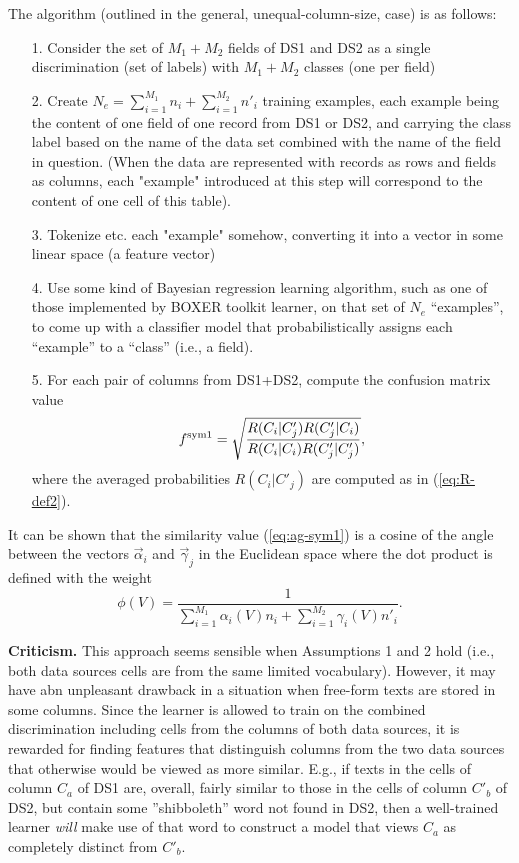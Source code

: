 \documentclass[12pt]{article}
\begin{document}
The algorithm (outlined in the general, unequal-column-size, case) is
as follows:

\begin{enumerate}
\item[1.] Consider the set of $M_1+M_2$ fields of DS1 and DS2 as a single
  discrimination (set of labels) with $M_1+M_2$ classes (one per field)

\item[2.] Create $N_e = \sum_{i=1}^{M_1} n_i + \sum_{i=1}^{M_2} n'_i$
  training examples, each example being the content of one field of
  one record from DS1 or DS2, and carrying the class label based on
  the name of the data set combined with the name of the field in
  question. (When the data are represented with records as rows and
  fields as columns, each "example" introduced at this step will
  correspond to the content of one cell of this table).

\item[3.] Tokenize etc. each "example" somehow, converting it into a
  vector in some linear space (a feature vector)

\item[4.] Use some kind of Bayesian regression learning algorithm, such
  as one of those implemented by BOXER toolkit learner, on that set of $N_e$
  ``examples'', to come up with a classifier model that
  probabilistically assigns each ``example'' to a ``class'' (i.e., a
  field). 

\item[5.] For each pair of columns from DS1+DS2, compute the confusion
  matrix value
\begin{equation}
\label{eq:ag-sym1}
f^{\rm sym 1} = \sqrt{\frac{ R(C_i|C'_j) R(C'_j|C_i) }{ R(C_i|C_i) R(C'_j|C'_j)}},
\end{equation}
where the averaged probabilities  $R(C_i|C'_j)$ are computed as in (\ref{eq:R-def2}).
\end{enumerate}

It can be shown that the similarity value (\ref{eq:ag-sym1}) is a
cosine of the angle between the vectors $\vec\alpha_i$ and
$\vec\gamma_j$ in the Euclidean space where the dot product is defined
with the weight
$$
\phi(V) =
 \frac{1}{ \sum_{i=1}^{M_1} \alpha_i(V) n_i + \sum_{i=1}^{M_2} \gamma_i(V) n'_i}.
$$

{\bf Criticism.} This approach seems sensible when Assumptions 1 and 2
hold (i.e., both data sources cells are from the same limited
vocabulary). However, it may have abn unpleasant drawback in a
situation when free-form texts are stored in some columns.  Since the
learner is allowed to train on the combined discrimination including
cells from the columns of both data sources, it is rewarded for
finding features that distinguish columns from the two data sources
that otherwise would be viewed as more similar. E.g., if texts in the
cells of column $C_a$ of DS1 are, overall, fairly similar to those in
the cells of column $C'_b$ of DS2, but contain some ''shibboleth''
word not found in DS2, then a well-trained learner {\em will} make
use of that word to construct a model that views $C_a$ as completely
distinct from $C'_b$.
\end{document}
